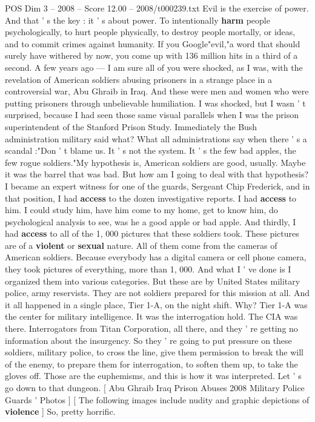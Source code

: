 \begin{textsample}{POS Dim 3 – 2008 – Score 12.00 – 2008/t000239.txt}
Evil is the exercise of power.
And that ' s the key : it ' s about power.
To intentionally \textbf{harm} people psychologically, to hurt people physically, to destroy people mortally, or ideas, and to commit crimes against humanity.
If you Google"evil,"a word that should surely have withered by now, you come up with 136 million hits in a third of a second.
A few years ago — I am sure all of you were shocked, as I was, with the revelation of American soldiers abusing prisoners in a strange place in a controversial war, Abu Ghraib in Iraq.
And these were men and women who were putting prisoners through unbelievable humiliation.
I was shocked, but I wasn ' t surprised, because I had seen those same visual parallels when I was the prison superintendent of the Stanford Prison Study.
Immediately the Bush administration military said what?
What all administrations say when there ' s a scandal :"Don ' t blame us.
It ' s not the system.
It ' s the few bad apples, the few rogue soldiers."My hypothesis is, American soldiers are good, usually.
Maybe it was the barrel that was bad.
But how am I going to deal with that hypothesis?
I became an expert witness for one of the guards, Sergeant Chip Frederick, and in that position, I had \textbf{access} to the dozen investigative reports.
I had \textbf{access} to him.
I could study him, have him come to my home, get to know him, do psychological analysis to see, was he a good apple or bad apple.
And thirdly, I had \textbf{access} to all of the 1, 000 pictures that these soldiers took.
These pictures are of a \textbf{violent} or \textbf{sexual} nature.
All of them come from the cameras of American soldiers.
Because everybody has a digital camera or cell phone camera, they took pictures of everything, more than 1, 000.
And what I ' ve done is I organized them into various categories.
But these are by United States military police, army reservists.
They are not soldiers prepared for this mission at all.
And it all happened in a single place, Tier 1-A, on the night shift.
Why?
Tier 1-A was the center for military intelligence.
It was the interrogation hold.
The CIA was there.
Interrogators from Titan Corporation, all there, and they ' re getting no information about the insurgency.
So they ' re going to put pressure on these soldiers, military police, to cross the line, give them permission to break the will of the enemy, to prepare them for interrogation, to soften them up, to take the gloves off.
Those are the euphemisms, and this is how it was interpreted.
Let ' s go down to that dungeon. [ Abu Ghraib Iraq Prison Abuses 2008 Military Police Guards ' Photos ] [ The following images include nudity and graphic depictions of \textbf{violence} ] So, pretty horrific.

\end{textsample}
